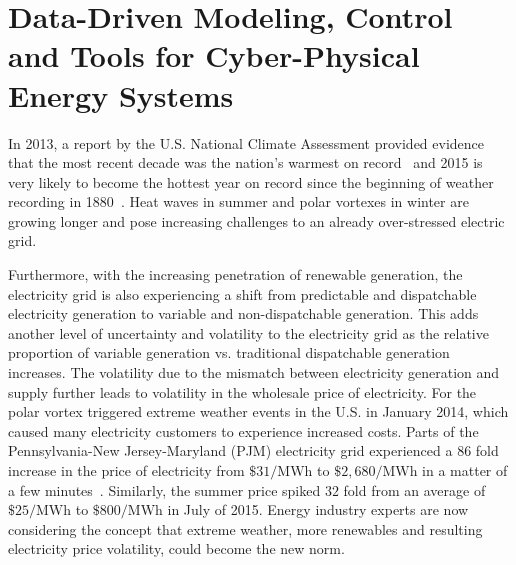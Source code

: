 \section{Data-Driven Modeling, Control and Tools for Cyber-Physical Energy Systems}

In 2013, a report by the U.S. National Climate Assessment provided evidence that the most recent decade was the nation's warmest on record~\cite{melillo2014climate} and 2015 is very likely to become the hottest year on record since the beginning of weather recording in 1880~\cite{noaa}. 
Heat waves in summer and polar vortexes in winter are growing longer and pose increasing challenges to an already over-stressed electric grid. 

Furthermore, with the increasing penetration of renewable generation, the electricity grid is also experiencing a shift from predictable and dispatchable electricity generation to variable and non-dispatchable generation. 
This adds another level of uncertainty and volatility to the electricity grid as the relative proportion of variable generation vs. traditional dispatchable generation increases.
The volatility due to the mismatch between electricity generation and supply further leads to volatility in the wholesale price of electricity.
For \eg the polar vortex triggered extreme weather events in the U.S. in January 2014, which caused many electricity customers to experience increased costs.
Parts of the Pennsylvania-New Jersey-Maryland (PJM) electricity grid experienced a $86$ fold increase in the price of electricity from $\$31/\si{\mega\watt\hour}$ to $\$2,680/\si{\mega\watt\hour}$ in a matter of a few minutes~\cite{volatility}. 
Similarly, the summer price spiked $32$ fold from an average of $\$25/\si{\mega\watt\hour}$ to $\$800/\si{\mega\watt\hour}$ in July of 2015.
Energy industry experts are now considering the concept that extreme weather, more renewables and resulting electricity price volatility, could become the new norm.


